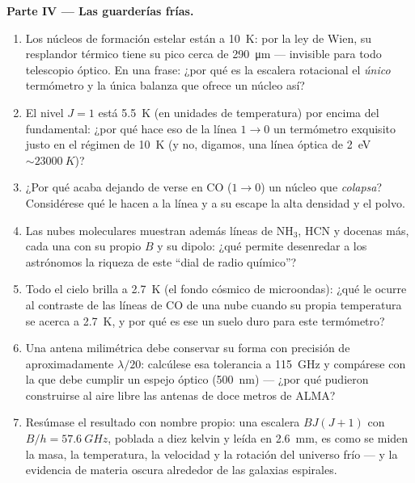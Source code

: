 \begin{problem}
\medskip\noindent\textbf{Parte IV --- Las guarderías frías.}
\begin{enumerate}[resume]
  \item Los núcleos de formación estelar están a \qty{10}{K}: por la ley
        de Wien, su resplandor térmico tiene su pico cerca de
        \qty{290}{\micro m} --- invisible para todo telescopio óptico.
        En una frase: ¿por qué es la escalera rotacional el \emph{único}
        termómetro y la única balanza que ofrece un núcleo así?
  \item El nivel $J = 1$ está \qty{5.5}{K} (en unidades de temperatura)
        por encima del fundamental: ¿por qué hace eso de la línea
        $1\to0$ un termómetro exquisito justo en el régimen de
        \qty{10}{K} (y no, digamos, una línea óptica de
        \qty{2}{eV} $\sim \qty{23000}{K}$)?
  \item ¿Por qué acaba dejando de verse en CO ($1\to0$) un núcleo que
        \emph{colapsa}? Considérese qué le hacen a la línea y a su escape
        la alta densidad y el polvo.
  \item Las nubes moleculares muestran además líneas de NH$_3$, HCN y
        docenas más, cada una con su propio $B$ y su dipolo: ¿qué
        permite desenredar a los astrónomos la riqueza de este ``dial de
        radio químico''?
  \item Todo el cielo brilla a \qty{2.7}{K} (el fondo cósmico de
        microondas): ¿qué le ocurre al contraste de las líneas de CO de
        una nube cuando su propia temperatura se acerca a
        \qty{2.7}{K}, y por qué es ese un suelo duro para este
        termómetro?
  \item Una antena milimétrica debe conservar su forma con precisión de
        aproximadamente $\lambda/20$: calcúlese esa tolerancia a
        \qty{115}{GHz} y compárese con la que debe cumplir un espejo
        óptico (\qty{500}{nm}) --- ¿por qué pudieron construirse al aire
        libre las antenas de doce metros de ALMA?
  \item Resúmase el resultado con nombre propio: una escalera $BJ(J+1)$ con $B/h =
        \qty{57.6}{GHz}$, poblada a diez kelvin y leída en
        \qty{2.6}{mm}, es como se miden la masa, la temperatura, la
        velocidad y la rotación del universo frío --- y la evidencia de
        materia oscura alrededor de las galaxias espirales.
\end{enumerate}
\end{problem}
